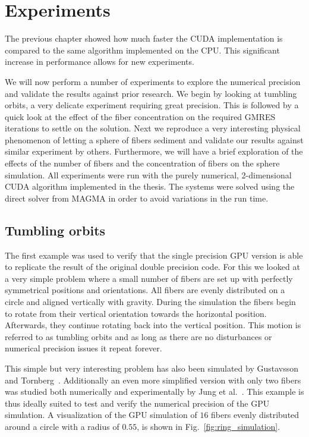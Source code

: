 \chapter{Experiments}
\label{cha:experiments}

The previous chapter showed how much faster the CUDA implementation is compared to the same algorithm implemented on the CPU. This significant increase in performance allows for new experiments.

We will now perform a number of experiments to explore the numerical precision and validate the results against prior research. We begin by looking at tumbling orbits, a very delicate experiment requiring great precision. This is followed by a quick look at the effect of the fiber concentration on the required GMRES iterations to settle on the solution. Next we reproduce a very interesting physical phenomenon of letting a sphere of fibers sediment and validate our results against similar experiment by others. Furthermore, we will have a brief exploration of the effects of the number of fibers and the concentration of fibers on the sphere simulation. All experiments were run with the purely numerical, 2-dimensional CUDA algorithm  implemented in the thesis. The systems were solved using the direct solver from MAGMA in order to avoid variations in the run time.

\section{Tumbling orbits}
\label{sec:example_ring}

The first example was used to verify that the single precision GPU version is able to replicate the result of the original double precision code. For this we looked at a very simple problem where a small number of fibers are set up with perfectly symmetrical positions and orientations. All fibers are evenly distributed on a circle and aligned vertically with gravity. During the simulation the fibers begin to rotate from their vertical orientation towards the horizontal position. Afterwards, they continue rotating back into the vertical position. This motion is referred to as tumbling orbits and as long as there are no disturbances or numerical precision issues it repeat forever.

This simple but very interesting problem has also been simulated by Gustavsson and Tornberg~\cite{Gustavsson2009}. Additionally an even more simplified version with only two fibers was studied both numerically and experimentally by Jung et al.~\cite{Jung2006}. This example is thus ideally suited to test and verify the numerical precision of the GPU simulation. A visualization of the GPU simulation of $16$ fibers evenly distributed around a circle with a radius of $0.55$, is shown in Fig.~\ref{fig:ring_simulation}.

